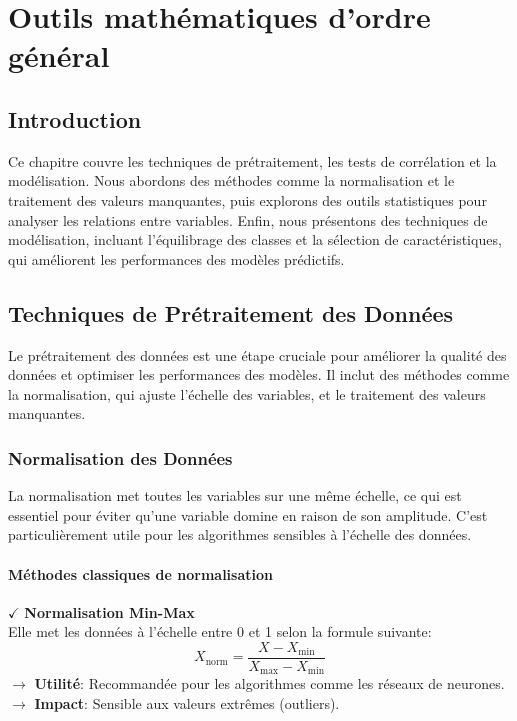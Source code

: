 \chapter{Outils mathématiques d'ordre général}
\begin{spacing}{1.2}
\minitoc
\thispagestyle{MyStyle}
\end{spacing}
\newpage
\justifying

\sloppy {} 
\section{Introduction}

Ce chapitre couvre les techniques de prétraitement, les tests de corrélation et la modélisation. Nous abordons des méthodes comme la normalisation et le traitement des valeurs manquantes, puis explorons des outils statistiques pour analyser les relations entre variables. Enfin, nous présentons des techniques de modélisation, incluant l’équilibrage des classes et la sélection de caractéristiques, qui améliorent les performances des modèles prédictifs.

\section{Techniques de Prétraitement des Données}

Le prétraitement des données est une étape cruciale pour améliorer la qualité des données et optimiser les performances des modèles. Il inclut des méthodes comme la normalisation, qui ajuste l'échelle des variables, et le traitement des valeurs manquantes.

\subsection{Normalisation des Données}

La normalisation met toutes les variables sur une même échelle, ce qui est essentiel pour éviter qu'une variable domine en raison de son amplitude. C’est particulièrement utile pour les algorithmes sensibles à l'échelle des données.

\subsubsection{Méthodes classiques de normalisation}

\textbf{\(\checkmark\)} \textbf{Normalisation Min-Max} \\
Elle met les données à l’échelle entre 0 et 1 selon la formule suivante: 
    \[
    X_{\text{norm}} = \frac{X - X_{\text{min}}}{X_{\text{max}} - X_{\text{min}}}
    \]
\textbf{\(\rightarrow\)} \textbf{Utilité}: Recommandée pour les algorithmes comme les réseaux de neurones.\\
\textbf{\(\rightarrow\)} \textbf{Impact}: Sensible aux valeurs extrêmes (outliers).


